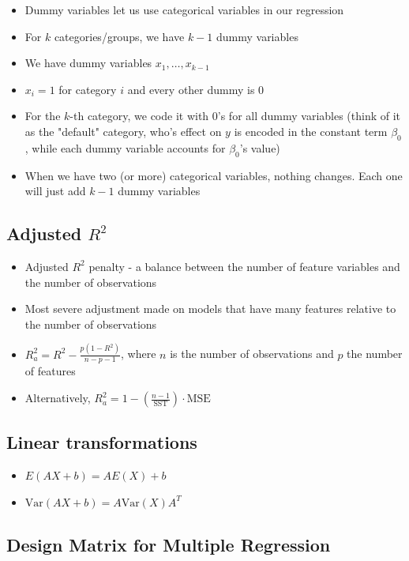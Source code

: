 \documentclass{article}
\begin{document}
\begin{itemize}
    \item Dummy variables let us use categorical variables in our regression
    \item For $k$ categories/groups, we have $k-1$ dummy variables
    \item We have dummy variables $x_1,\dots,x_{k-1}$
    \item $x_i=1$ for category $i$ and every other dummy is 0
    \item For the $k$-th category, we code it with 0's for all dummy variables (think of it as the "default" category, who's effect on $y$ is encoded in the constant term $\beta_0$, while each dummy variable accounts for $\beta_0$'s value)
    \item When we have two (or more) categorical variables, nothing changes. Each one will just add $k-1$ dummy variables
\end{itemize}

\subsection{Adjusted $R^2$}

\begin{itemize}
    \item Adjusted $R^2$ penalty - a balance between the number of feature variables and the number of observations
    \item Most severe adjustment made on models that have many features relative to the number of observations
    \item $R_a^2=R^2-\frac{p(1-R^2)}{n-p-1}$, where $n$ is the number of observations and $p$ the number of features
    \item Alternatively, $R_a^2=1-(\frac{n-1}{\text{SST}}) \cdot \text{MSE}$
\end{itemize}

\subsection{Linear transformations}

\begin{itemize}
    \item $E(AX+b)=AE(X)+b$
    \item $\text{Var}(AX+b)=A\text{Var}(X)A^T$
\end{itemize}

\subsection{Design Matrix for Multiple Regression}
\end{document}
